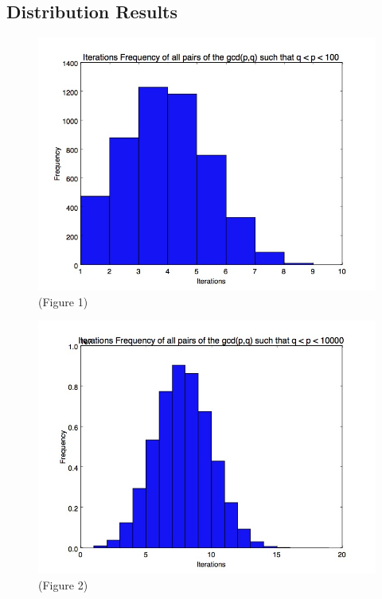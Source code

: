 \documentclass[8pt]{beamer}
\begin{document}
\subsection{Distribution Results}
\begin{frame}
\begin{figure}
		
		\center \includegraphics[scale=.3]{2digit_iterationfreq.jpg}
		\center \tiny(Figure 1)
\end{figure}


\end{frame}

\begin{frame}
\begin{figure}
		
		\center \includegraphics[scale=.3]{4digit_iteration_freq.jpg}
		\center \tiny(Figure 2)
\end{figure}


\end{frame}
\end{document}
